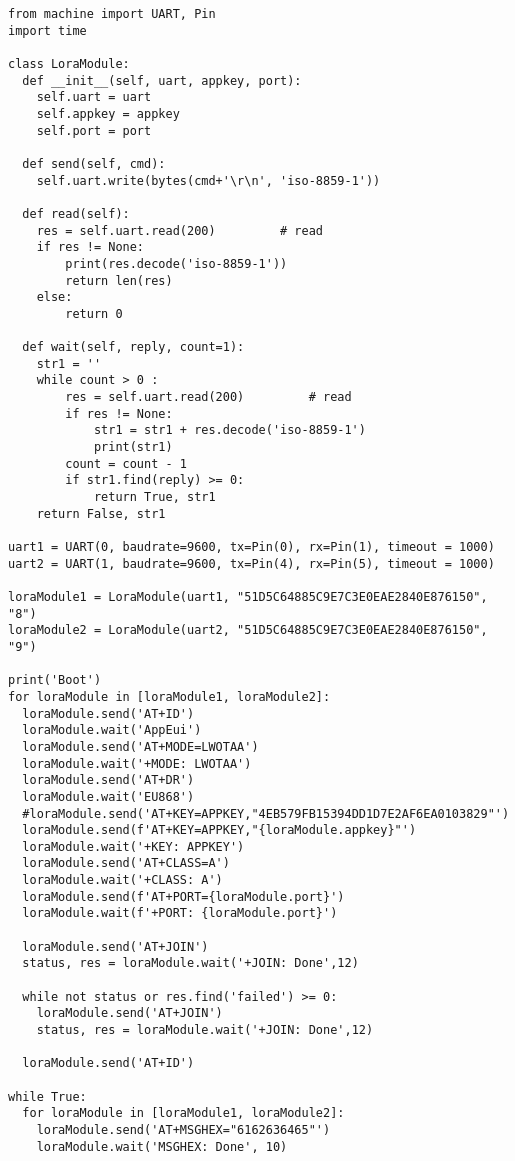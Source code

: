 \begin{verbatim}
from machine import UART, Pin
import time

class LoraModule:
  def __init__(self, uart, appkey, port):
    self.uart = uart
    self.appkey = appkey
    self.port = port

  def send(self, cmd):
    self.uart.write(bytes(cmd+'\r\n', 'iso-8859-1'))
  
  def read(self):
    res = self.uart.read(200)         # read 
    if res != None:
        print(res.decode('iso-8859-1'))
        return len(res)
    else:
        return 0
  
  def wait(self, reply, count=1):
    str1 = ''
    while count > 0 :
        res = self.uart.read(200)         # read 
        if res != None:
            str1 = str1 + res.decode('iso-8859-1')
            print(str1)
        count = count - 1
        if str1.find(reply) >= 0:
            return True, str1
    return False, str1

uart1 = UART(0, baudrate=9600, tx=Pin(0), rx=Pin(1), timeout = 1000)
uart2 = UART(1, baudrate=9600, tx=Pin(4), rx=Pin(5), timeout = 1000)

loraModule1 = LoraModule(uart1, "51D5C64885C9E7C3E0EAE2840E876150", "8")
loraModule2 = LoraModule(uart2, "51D5C64885C9E7C3E0EAE2840E876150", "9")

print('Boot')
for loraModule in [loraModule1, loraModule2]:
  loraModule.send('AT+ID')
  loraModule.wait('AppEui')
  loraModule.send('AT+MODE=LWOTAA')
  loraModule.wait('+MODE: LWOTAA')
  loraModule.send('AT+DR')
  loraModule.wait('EU868')
  #loraModule.send('AT+KEY=APPKEY,"4EB579FB15394DD1D7E2AF6EA0103829"')
  loraModule.send(f'AT+KEY=APPKEY,"{loraModule.appkey}"')
  loraModule.wait('+KEY: APPKEY')
  loraModule.send('AT+CLASS=A')
  loraModule.wait('+CLASS: A')
  loraModule.send(f'AT+PORT={loraModule.port}')
  loraModule.wait(f'+PORT: {loraModule.port}')

  loraModule.send('AT+JOIN')
  status, res = loraModule.wait('+JOIN: Done',12)
  
  while not status or res.find('failed') >= 0:
    loraModule.send('AT+JOIN')
    status, res = loraModule.wait('+JOIN: Done',12)

  loraModule.send('AT+ID')

while True:
  for loraModule in [loraModule1, loraModule2]:
    loraModule.send('AT+MSGHEX="6162636465"')
    loraModule.wait('MSGHEX: Done', 10)

\end{verbatim}